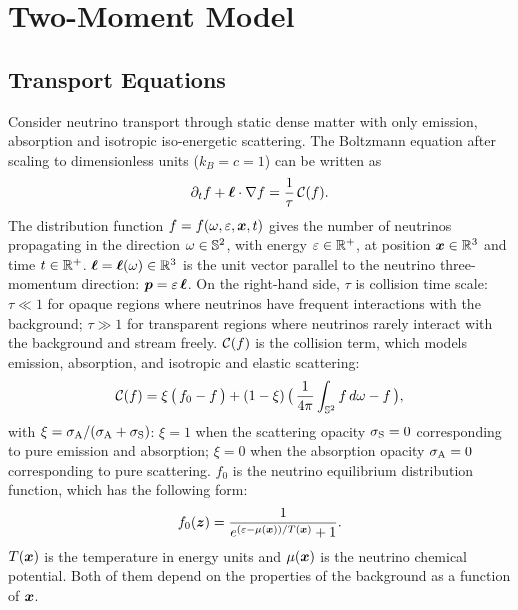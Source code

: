 \section{Two-Moment Model}\label{se:Two-MomentModel}

\subsection{Transport Equations}
Consider neutrino transport through static dense matter with only emission, absorption and isotropic iso-energetic scattering.
The Boltzmann equation after scaling to dimensionless units ($k_{B} = c = 1$) can be written as
\begin{equation}
  \pd{f}{t}+\vect{\ell}\cdot\nabla f
  =\f{1}{\tau}\,\cC(f).
  \label{eq:boltzmann}
\end{equation}
The distribution function $f = f(\omega,\varepsilon,\boldsymbol{x},t)$ gives the number of neutrinos propagating in the direction $\omega\in\mathbb{S}^{2}$, with energy $\varepsilon\in\mathbb{R}^{+}$, at position $\boldsymbol{x}\in\mathbb{R}^{3}$ and time $t\in\mathbb{R}^{+}$.  
$\boldsymbol{\ell} = \boldsymbol{\ell}(\omega)\in\mathbb{R}^{3}$ is the unit vector parallel to the neutrino three-momentum direction: $\boldsymbol{p}=\varepsilon\,\boldsymbol{\ell}$.
On the right-hand side, $\tau$ is collision time scale: $\tau\ll1$ for opaque regions where neutrinos have frequent interactions with the background; $\tau\gg1$ for transparent regions where neutrinos rarely interact with the background and stream freely.
$\mathcal{C}(f)$ is the collision term, which models emission, absorption, and isotropic and elastic scattering: 
\begin{equation}
  \cC(f)=\xi\,\big(\,f_{0}-f\,\big)
  +(1-\xi)\,\big(\,\f{1}{4\pi}\int_{\bbS^{2}}f\,d\omega-f\,\big),
  \label{eq:collisionTerm}
\end{equation}
with $\xi = \sigma_{{\rm A}} / (\sigma_{{\rm A}}  + \sigma_{{\rm S}} )$: $\xi = 1$ when the scattering opacity $\sigma_{{\rm S}} = 0$ corresponding to pure emission and absorption; $\xi = 0$ when the absorption opacity $\sigma_{{\rm A}} = 0$ corresponding to pure scattering. 
$f_{0}$ is the neutrino equilibrium distribution function, which has the following form:
\begin{equation}
  f_{0}(\vect{z})=\f{1}{e^{(\varepsilon-\mu(\vect{x}))/T(\vect{x})}+1}.
  \label{eq:fermiDirac}
\end{equation}
$T(\boldsymbol{x})$ is the temperature in energy units and $\mu(\boldsymbol{x})$ is the neutrino chemical potential.
Both of them depend on the properties of the background as a function of $\boldsymbol{x}$.

